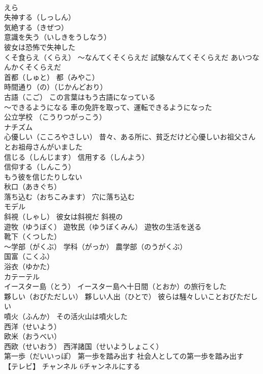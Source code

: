 \documentclass[8pt]{extreport}
\begin{document}
\begin{CJK}{UTF8}{min}
\\	えら
\\	失神する（しっしん）
\\	気絶する（きぜつ） 
\\	意識を失う（いしきをうしなう）
\\	彼女は恐怖で失神した
\\	くそ食らえ（くらえ） ～なんてくそくらえだ 試験なんてくそくらえだ あいつなんかくそくらえだ
\\	首都（しゅと） 都（みやこ）
\\	時間通り（の）（じかんどおり）
\\	古語（こご） この言葉はもう古語になっている
\\	～できるようになる 車の免許を取って、運転できるようになった
\\	公立学校 （こうりつがっこう）
\\	ナチズム
\\	心優しい（こころやさしい） 昔々、ある所に、貧乏だけど心優しいお祖父さんとお祖母さんがいました
\\	信じる（しんじます） 信用する（しんよう） 
\\	信仰する（しんこう） 
\\	もう彼を信じたりしない
\\	秋口（あきぐち）
\\	落ち込む（おちこみます） 穴に落ち込む
\\	モデル
\\	斜視（しゃし） 彼女は斜視だ 斜視の
\\	遊牧（ゆうぼく） 遊牧民（ゆうぼくみん） 遊牧の生活を送る
\\	靴下（くつした）
\\	～学部（がくぶ） 学科（がっか） 農学部（のうがくぶ）
\\	国富（こくふ）
\\	浴衣（ゆかた）
\\	カテーテル
\\	イースター島（とう） イースター島へ十日間（とおか）の旅行をした
\\	夥しい（おびただしい） 夥しい人出（ひとで） 彼らは騒々しいことおびただしい
\\	噴火（ふんか） その活火山は噴火した
\\	西洋（せいよう）
\\	欧米（おうべい）
\\	西欧（せいおう） 西洋諸国（せいようしょこく）
\\	第一歩（だいいっぽ） 第一歩を踏み出す 社会人としての第一歩を踏み出す
\\	【テレビ】	チャンネル 6チャンネルにする

\end{CJK}
\end{document}
